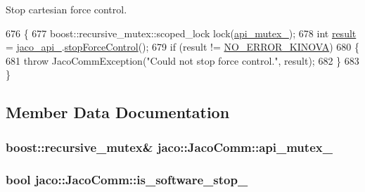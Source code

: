Stop cartesian force control. 


\begin{DoxyCode}
676 \{
677     boost::recursive\_mutex::scoped\_lock lock(\hyperlink{classjaco_1_1JacoComm_ac6ef2a6b3c51877fc4237d834c35908a}{api\_mutex\_});
678     \textcolor{keywordtype}{int} \hyperlink{Kinova_8API_8CommLayerUbuntu_8h_a900dac90961bada00f57c207562a6a9a}{result} = \hyperlink{classjaco_1_1JacoComm_a8d1510c941f28a4e8f921691d4fd2248}{jaco\_api\_}.\hyperlink{classjaco_1_1JacoAPI_ac3881ef354400b32a4d71796dba66d67}{stopForceControl}();
679     \textcolor{keywordflow}{if} (result != \hyperlink{Kinova_8API_8CommLayerUbuntu_8h_a510f2320a2a31d2d225adc0da7bef595}{NO\_ERROR\_KINOVA})
680     \{
681         \textcolor{keywordflow}{throw} JacoCommException(\textcolor{stringliteral}{"Could not stop force control."}, result);
682     \}
683 \}
\end{DoxyCode}


\subsection{Member Data Documentation}
\subsubsection[{\texorpdfstring{api\+\_\+mutex\+\_\+}{api_mutex_}}]{\setlength{\rightskip}{0pt plus 5cm}boost\+::recursive\+\_\+mutex\& jaco\+::\+Jaco\+Comm\+::api\+\_\+mutex\+\_\+\hspace{0.3cm}{\ttfamily [private]}}\hypertarget{classjaco_1_1JacoComm_ac6ef2a6b3c51877fc4237d834c35908a}{}\label{classjaco_1_1JacoComm_ac6ef2a6b3c51877fc4237d834c35908a}
\subsubsection[{\texorpdfstring{is\+\_\+software\+\_\+stop\+\_\+}{is_software_stop_}}]{\setlength{\rightskip}{0pt plus 5cm}bool jaco\+::\+Jaco\+Comm\+::is\+\_\+software\+\_\+stop\+\_\+\hspace{0.3cm}{\ttfamily [private]}}\hypertarget{classjaco_1_1JacoComm_a9607500fac99c4dbc5acc98dd513eec3}{}\label{classjaco_1_1JacoComm_a9607500fac99c4dbc5acc98dd513eec3}
